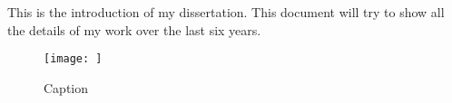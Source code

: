 \label{ch:intro}
This is the introduction of my dissertation. This document will try to show all the details of my work over the last six years.

\begin{figure}
    \centering
    \texttt{[image: ]}
    \caption{Caption}
    \label{fig:my_label}
\end{figure}